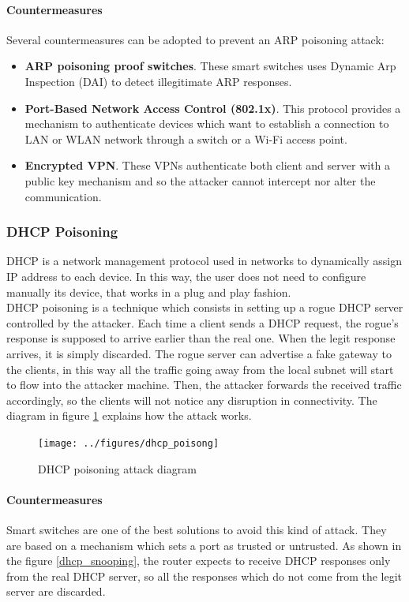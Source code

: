 \documentclass[final]{article}
\begin{document}
\paragraph{Countermeasures}
Several countermeasures can be adopted to prevent an \ac{ARP} poisoning attack:
\begin{itemize}
  \item \textbf{\ac{ARP} poisoning proof switches}. These smart switches uses Dynamic Arp Inspection (DAI) to detect illegitimate ARP responses. \cite{7345444}
  \item \textbf{Port-Based Network Access Control (802.1x)}. This protocol provides a mechanism to authenticate devices which want to establish a connection to LAN or WLAN network through a switch or a Wi-Fi access point. \cite{Qinggui_Hu}
  \item \textbf{Encrypted VPN}. These VPNs authenticate both client and server with a public key mechanism and so the attacker cannot intercept nor alter the communication.
\end{itemize}

\subsubsection{DHCP Poisoning}
\ac{DHCP} is a network management protocol used in networks to dynamically assign IP address to each device.
In this way, the user does not need to configure manually its device, that works in a plug and play fashion.\\
\ac{DHCP} poisoning is a technique which consists in setting up a rogue \ac{DHCP}  server controlled by the attacker.
Each time a client sends a \ac{DHCP} request, the rogue's response is supposed to arrive earlier than the real one.
When the legit response arrives, it is simply discarded.
The rogue server can advertise a fake gateway to the clients, in this way all the traffic going away from the local subnet will start to flow into the attacker machine.
Then, the attacker forwards the received traffic accordingly, so the clients will not notice any disruption in connectivity.
The diagram in figure \ref{dhcp_poisoning} explains how the attack works.
\begin{figure}
\center
\texttt{[image: ../figures/dhcp\_poisong]}
\caption{DHCP poisoning attack diagram}
\label{dhcp_poisoning}
\end{figure}
\paragraph{Countermeasures}
Smart switches are one of the best solutions to avoid this kind of attack.
They are based on a mechanism which sets a port as trusted or untrusted.
As shown in the figure \ref{dhcp_snooping}, the router expects to receive DHCP responses only from the real DHCP server,
so all the responses which do not come from the legit server are discarded.
\end{document}

